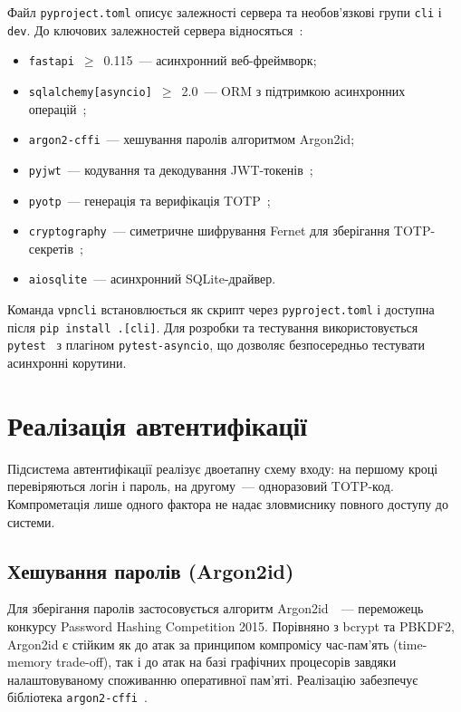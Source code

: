 Файл \texttt{pyproject.toml} описує залежності сервера та необов'язкові групи
\texttt{cli} і \texttt{dev}. До ключових залежностей сервера
відносяться~\cite{fastapi2024, sqlalchemy2024, argon2cffi2024, pyjwt2024,
pyotp2024, cryptography2024}:

\begin{itemize}
  \item \texttt{fastapi}~$\geq$~0.115~--- асинхронний веб-фреймворк;
  \item \texttt{sqlalchemy[asyncio]}~$\geq$~2.0~--- ORM з підтримкою
        асинхронних операцій~\cite{sqlalchemy2024};
  \item \texttt{argon2-cffi}~--- хешування паролів алгоритмом Argon2id;
  \item \texttt{pyjwt}~--- кодування та декодування JWT-токенів~\cite{pyjwt2024};
  \item \texttt{pyotp}~--- генерація та верифікація TOTP~\cite{pyotp2024};
  \item \texttt{cryptography}~--- симетричне шифрування Fernet для зберігання
        TOTP-секретів~\cite{cryptography2024};
  \item \texttt{aiosqlite}~--- асинхронний SQLite-драйвер.
\end{itemize}

Команда \texttt{vpncli} встановлюється як скрипт через \texttt{pyproject.toml}
і доступна після \texttt{pip install .[cli]}. Для розробки та тестування
використовується \texttt{pytest}~\cite{pytest2024} з плагіном
\texttt{pytest-asyncio}, що дозволяє безпосередньо тестувати
асинхронні корутини.

\section{Реалізація автентифікації}
\label{sec:auth_implementation}

Підсистема автентифікації реалізує двоетапну схему входу: на першому
кроці перевіряються логін і пароль, на другому~--- одноразовий TOTP-код.
Компрометація лише одного фактора не надає зловмиснику
повного доступу до системи.

\subsection{Хешування паролів (Argon2id)}

Для зберігання паролів застосовується алгоритм Argon2id~\cite{biryukov2016argon2}~---
переможець конкурсу Password Hashing Competition 2015. Порівняно з
bcrypt та PBKDF2, Argon2id є стійким як до атак за принципом компромісу час-пам'ять (time-memory
trade-off), так і до атак на базі графічних процесорів завдяки
налаштовуваному споживанню оперативної пам'яті. Реалізацію забезпечує
бібліотека \texttt{argon2-cffi}~\cite{argon2cffi2024}.

